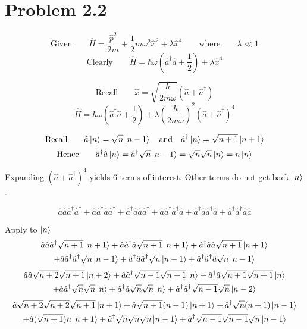 \documentclass{amsart}
\begin{document}
\section*{Problem 2.2}
\[\text{Given}\qquad\hat{H}=\frac{\hat{p}^2}{2m}+\frac{1}{2}m\omega^2\hat{x}^2+\lambda\hat{x}^4\qquad\text{where}\qquad \lambda\ll 1 \]
\[\text{Clearly}\qquad\hat{H}=\hbar\omega\left(\hat{a}^\dagger \hat{a} +\frac{1}{2}\right)+\lambda\hat{x}^4\]

\[\text{Recall}\qquad\hat{x}=\sqrt{\frac{\hbar}{2m\omega}}(\hat{a}+\hat{a}^\dagger)   \]
\[\hat{H}=\hbar\omega\left(\hat{a}^\dagger \hat{a} +\frac{1}{2}\right)+\lambda\left(\frac{\hbar}{2m\omega}\right)^2(\hat{a}+\hat{a}^\dagger)^4\]

\[\text{Recall}\qquad\hat{a}\ket{n} =\sqrt{n}\ket{n-1} \qq{and} \hat{a}^\dagger\ket{n} =\sqrt{n+1}\ket{n+1}  \]
\[\text{Hence}\qquad\hat{a}^\dagger\hat{a}\ket{n} =\hat{a}^\dagger\sqrt{n}\ket{n-1}=\sqrt{n}\sqrt{n}\ket{n}=n\ket{n} \]

Expanding $(\hat{a}+\hat{a}^\dagger)^4$ yields 6 terms of interest. Other terms do not get back $\ket{n}$.

\[\hat{a}\hat{a}\hat{a}^\dagger\hat{a}^\dagger+\hat{a}\hat{a}^\dagger\hat{a}\hat{a}^\dagger+\hat{a}^\dagger\hat{a}\hat{a}\hat{a}^\dagger+\hat{a}\hat{a}^\dagger\hat{a}^\dagger\hat{a}+\hat{a}^\dagger\hat{a}\hat{a}^\dagger\hat{a}+\hat{a}^\dagger\hat{a}^\dagger\hat{a}\hat{a}\]

Apply to $\ket{n}$
\begin{multline*}
\hat{a}\hat{a}\hat{a}^\dagger\sqrt{n+1}\ket{n+1}+\hat{a}\hat{a}^\dagger\hat{a}\sqrt{n+1}\ket{n+1}+\hat{a}^\dagger\hat{a}\hat{a}\sqrt{n+1}\ket{n+1}\\+\hat{a}\hat{a}^\dagger\hat{a}^\dagger\sqrt{n}\ket{n-1}+\hat{a}^\dagger\hat{a}\hat{a}^\dagger\sqrt{n}\ket{n-1}+\hat{a}^\dagger\hat{a}^\dagger\hat{a}\sqrt{n}\ket{n-1}
\end{multline*}
\begin{multline*}
\hat{a}\hat{a}\sqrt{n+2}\sqrt{n+1}\ket{n+2}+\hat{a}\hat{a}^\dagger\sqrt{n+1}\sqrt{n+1}\ket{n}+\hat{a}^\dagger\hat{a}\sqrt{n+1}\sqrt{n+1}\ket{n}\\+\hat{a}\hat{a}^\dagger\sqrt{n}\sqrt{n}\ket{n}+\hat{a}^\dagger\hat{a}\sqrt{n}\sqrt{n}\ket{n}+\hat{a}^\dagger\hat{a}^\dagger\sqrt{n-1}\sqrt{n}\ket{n-2}
\end{multline*}
\begin{multline*}
\hat{a}\sqrt{n+2}\sqrt{n+2}\sqrt{n+1}\ket{n+1}+\hat{a}\sqrt{n+1}(n+1)\ket{n+1}+\hat{a}^\dagger\sqrt{n}(n+1)\ket{n-1}\\+\hat{a}(\sqrt{n+1})n\ket{n+1}+\hat{a}^\dagger\sqrt{n}\sqrt{n}\sqrt{n}\ket{n-1}+\hat{a}^\dagger\sqrt{n-1}\sqrt{n-1}\sqrt{n}\ket{n-1}
\end{multline*}
\end{document}
